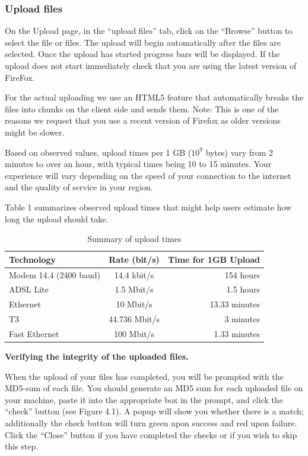 \documentclass[12pt,fullpage]{report}
\begin{document}
\subsubsection{Upload files}

On the Upload page, in the ``upload files'' tab, click on the ``Browse'' button to select the file or files.  The upload will begin automatically after the files are selected. Once the upload has started progress bars will be displayed. If the upload does not start immediately check that you are using the latest version of FireFox.

For the actual uploading we use an HTML5 feature \cite{HTML5FILEAPI} that automatically breaks the files into chunks on the client side and sends them. Note: This is one of the reasons we request that you use a recent version of Firefox as older versions might be slower.

Based on observed values, upload times per 1 GB ($10^9$ bytes) vary from 2 minutes to over an hour, with typical times being 10 to 15 minutes. Your experience will vary depending on the speed of your connection to the internet and the quality of service in your region.

Table 1 summarizes observed upload times that might help users estimate how long the upload should take.

\begin{table}
\begin{center}
\caption{Summary of upload times}
\begin{tabular}{ l | c | r }
Technology & Rate (bit/s) & Time for 1GB Upload\\
  \hline
Modem 14.4 (2400 baud) &	14.4 kbit/s&	154 hours\\
ADSL Lite & 1.5 Mbit/s &	1.5 hours\\
Ethernet&	10 Mbit/s & 13.33 minutes\\
T3 &	44.736 Mbit/s &~3 minutes\\
Fast Ethernet &	100 Mbit/s &1.33 minutes\\
  \hline
\end{tabular}
\end{center}
\end{table}

\noindent
{\bf Verifying the integrity of the uploaded files.}

When the upload of your files has completed, you will be prompted with the \gls{MD5}-sum of each file. You should generate an MD5 sum for each uploaded file on your machine, paste it into the appropriate box in the prompt, and click the ``check'' button (see Figure 4.1). A popup will show you whether there is a match; additionally the check button will turn green upon success and red upon failure. Click the ``Close'' button if you have completed the checks or if you wish to skip this step.
\end{document}
